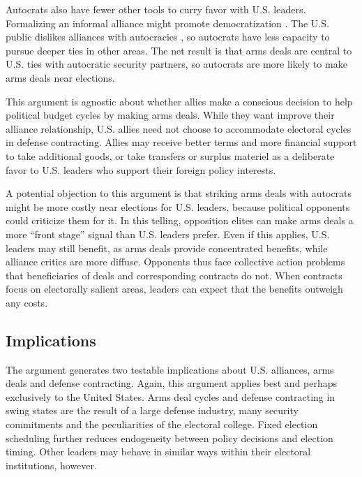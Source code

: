 \documentclass[12pt]{article}
\begin{document}
Autocrats also have fewer other tools to curry favor with U.S. leaders.
Formalizing an informal alliance might promote democratization \citep{GiblerWolford2006, Warren2016}.
The U.S. public dislikes alliances with autocracies \citep{Alley2022}, so autocrats have less capacity to pursue deeper ties in other areas. 
The net result is that arms deals are central to U.S. ties with autocratic security partners, so autocrats are more likely to make arms deals near elections. 


This argument is agnostic about whether allies make a conscious decision to help political budget cycles by making arms deals.
While they want improve their alliance relationship, U.S. allies need not choose to accommodate electoral cycles in defense contracting.
Allies may receive better terms and more financial support to take additional goods, or take transfers or surplus materiel as a deliberate favor to U.S. leaders who support their foreign policy interests. 


A potential objection to this argument is that striking arms deals with autocrats might be more costly near elections for U.S. leaders, because political opponents could criticize them for it. 
In this telling, opposition elites can make arms deals a more ``front stage'' signal than U.S. leaders prefer. 
Even if this applies, U.S. leaders may still benefit, as arms deals provide concentrated benefits, while alliance critics are more diffuse.%
Opponents thus face collective action problems that beneficiaries of deals and corresponding contracts do not. 
When contracts focus on electorally salient areas, leaders can expect that the benefits outweigh any costs. 



\subsection{Implications}



The argument generates two testable implications about U.S. alliances, arms deals and defense contracting. 
Again, this argument applies best and perhaps exclusively to the United States.  
Arms deal cycles and defense contracting in swing states are the result of a large defense industry, many security commitments and the peculiarities of the electoral college. 
Fixed election scheduling further reduces endogeneity between policy decisions and election timing. 
Other leaders may behave in similar ways within their electoral institutions, however. 
\end{document}
